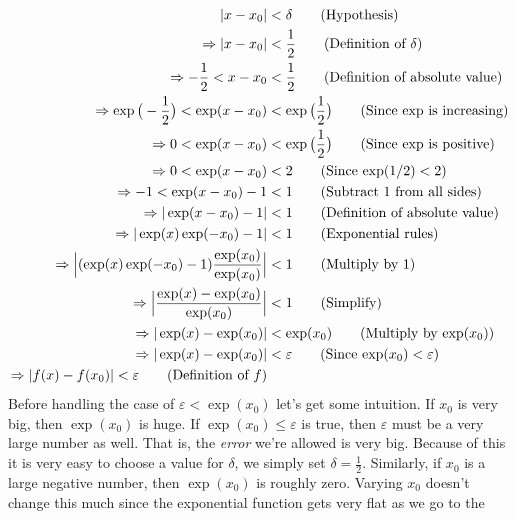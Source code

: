\documentclass{article}
\theoremstyle{normal}
\begin{document}
    \begin{align}
        |x-x_{0}|&<\delta
        \tag{Hypothesis}\\
        \Rightarrow
        |x-x_{0}|&<\frac{1}{2}
        \tag{Definition of $\delta$}\\
        \Rightarrow
        -\frac{1}{2}<x-x_{0}&<\frac{1}{2}
        \tag{Definition of absolute value}\\
        \Rightarrow
        \exp\big(-\frac{1}{2}\big)
        <\exp(x-x_{0})
        &<\exp\big(\frac{1}{2}\big)
        \tag{Since $\exp$ is increasing}\\
        \Rightarrow
        0<\exp(x-x_{0})&<\exp\big(\frac{1}{2}\big)
        \tag{Since $\exp$ is positive}\\
        \Rightarrow
        0<\exp(x-x_{0})&<2
        \tag{Since $\exp(1/2)<2$}\\
        \Rightarrow
        -1<\exp(x-x_{0})-1&<1
        \tag{Subtract 1 from all sides}\\
        \Rightarrow
        |\exp(x-x_{0})-1|&<1
        \tag{Definition of absolute value}\\
        \Rightarrow
        |\exp(x)\exp(-x_{0})-1|&<1
        \tag{Exponential rules}\\
        \Rightarrow
        \Big|(\exp(x)\exp(-x_{0})-1)\frac{\exp(x_{0})}{\exp(x_{0})}\Big|&<1
        \tag{Multiply by 1}\\
        \Rightarrow
        \Big|\frac{\exp(x)-\exp(x_{0})}{\exp(x_{0})}\Big|&<1
        \tag{Simplify}\\
        \Rightarrow
        |\exp(x)-\exp(x_{0})|&<\exp(x_{0})
        \tag{Multiply by $\exp(x_{0})$}\\
        \Rightarrow
        |\exp(x)-\exp(x_{0})|&<\varepsilon
        \tag{Since $\exp(x_{0})<\varepsilon$}\\
        \Rightarrow
        |f(x)-f(x_{0})|<\varepsilon
        \tag{Definition of $f$}
    \end{align}
    Before handling the case of $\varepsilon<\exp(x_{0})$ let's get some
    intuition. If $x_{0}$ is very big, then $\exp(x_{0})$ is huge.
    If $\exp(x_{0})\leq\varepsilon$ is true, then $\varepsilon$ must be a
    very large number as well. That is, the \textit{error} we're allowed is
    very big. Because of this it is very easy to choose a value for $\delta$,
    we simply set $\delta=\frac{1}{2}$.
    Similarly, if $x_{0}$ is a large negative
    number, then $\exp(x_{0})$ is roughly zero. Varying $x_{0}$ doesn't change
    this much since the exponential function gets very flat as we go to the
\end{document}
